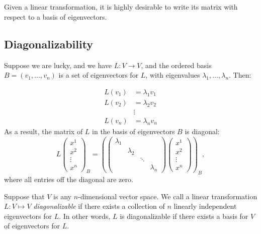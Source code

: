 \chapter{\diagTitle}\label{sec:diagonalization}



Given a linear transformation, it is highly desirable to write its matrix  with respect to a basis of eigenvectors.

\section{Diagonalizability}

Suppose we are lucky, and we have $L \colon V\to V$, and the ordered basis 
$B=(v_1, \ldots, v_n )$ is a set of %
eigenvectors for $L$, with eigenvalues $\lambda_1, \ldots, \lambda_n$.  Then:

\begin{align*}
L(v_1)&=\lambda_1 v_1 \\
L(v_2)&=\lambda_2 v_2 \\
&\vdots  \\
L(v_n)&=\lambda_n v_n
\end{align*}
As a result, the matrix of $L$ in the basis of eigenvectors $B$ is diagonal:
\[
L\begin{pmatrix}
x^1\\
x^2\\
\vdots\\
x^n
\end{pmatrix}_B
=
\left(
\begin{pmatrix}
\lambda_1    \\
& \lambda_2 &  & \\
&  & \ddots &  \\
& & & \lambda_n
\end{pmatrix}
\begin{pmatrix}
x^1\\
x^2\\
\vdots\\
x^n
\end{pmatrix}
\right)_B
,
\]
where all entries off the diagonal are zero.

Suppose that \(V\) is any \(n\)-dimensional vector space. We call a linear transformation $L \colon V\mapsto V$ \emph{diagonalizable} if there exists a collection of $n$ linearly independent eigenvectors for $L$.  In other words, $L$ is diagonalizable if there exists a basis for $V$ of eigenvectors for $L$.  

